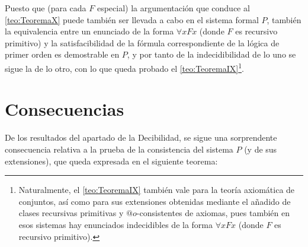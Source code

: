 Puesto que (para cada $F$ especial) la argumentación que conduce al \autoref{teo:TeoremaX} puede también ser llevada a cabo en el sistema formal $P$, también la equivalencia 
entre un enunciado de la forma $\forall x F x$ (donde $F$ es recursivo primitivo) y la satisfacibilidad de la fórmula correspondiente de la lógica de primer orden es demostrable en $P$, 
y por tanto de la indecidibilidad de lo uno se sigue la de lo otro, con lo que queda probado el \autoref{teo:TeoremaIX}\footnote{Naturalmente, el \autoref{teo:TeoremaIX} también vale 
para la teoría axiomática de conjuntos, así como para sus extensiones obtenidas mediante el añadido de clases recursivas primitivas y $@o$-consistentes de axiomas, pues también en esos
sistemas hay enunciados indecidibles de la forma $\forall xFx$ (donde $F$ es recursivo primitivo).}.


\section{Consecuencias}
De los resultados del apartado de la Decibilidad, se sigue una sorprendente consecuencia relativa a la prueba de la consistencia del sistema $P$ (y de sus extensiones), que queda 
expresada en el siguiente teorema:

